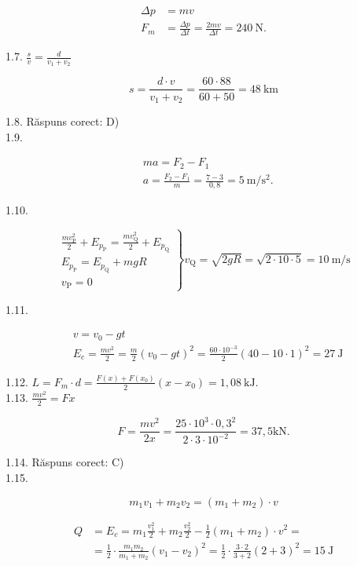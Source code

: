 $$
\begin{aligned}
\Delta p & =m v \\
F_{m} & =\frac{\Delta p}{\Delta t}=\frac{2 m v}{\Delta t}=240 \mathrm{~N} .
\end{aligned}
$$

1.7. $\frac{s}{v}=\frac{d}{v_{1}+v_{2}}$

$$
s=\frac{d \cdot v}{v_{1}+v_{2}}=\frac{60 \cdot 88}{60+50}=48 \mathrm{~km}
$$

1.8. Răspuns corect: D)\\
1.9.

$$
\begin{aligned}
& m a=F_{2}-F_{1} \\
& a=\frac{F_{2}-F_{1}}{m}=\frac{7-3}{0,8}=5 \mathrm{~m} / \mathrm{s}^{2} .
\end{aligned}
$$

1.10.

$$
\left.\begin{array}{l}
\frac{m v_{\mathrm{P}}^{2}}{2}+E_{p_{\mathrm{P}}}=\frac{m v_{\mathrm{Q}}^{2}}{2}+E_{p_{\mathrm{Q}}} \\
E_{p_{\mathrm{P}}}=E_{p_{\mathrm{Q}}}+m g R \\
v_{\mathrm{P}}=0
\end{array}\right\} v_{\mathrm{Q}}=\sqrt{2 g R}=\sqrt{2 \cdot 10 \cdot 5}=10 \mathrm{~m} / \mathrm{s}
$$

1.11.

$$
\begin{aligned}
& v=v_{0}-g t \\
& E_{c}=\frac{m v^{2}}{2}=\frac{m}{2}\left(v_{0}-g t\right)^{2}=\frac{60 \cdot 10^{-3}}{2}(40-10 \cdot 1)^{2}=27 \mathrm{~J}
\end{aligned}
$$

1.12. $L=F_{m} \cdot d=\frac{F(x)+F\left(x_{0}\right)}{2}\left(x-x_{0}\right)=1,08 \mathrm{~kJ}$.\\
1.13. $\frac{m v^{2}}{2}=F x$

$$
F=\frac{m v^{2}}{2 x}=\frac{25 \cdot 10^{3} \cdot 0,3^{2}}{2 \cdot 3 \cdot 10^{-2}}=37,5 \mathrm{kN} .
$$

1.14. Răspuns corect: C)\\
1.15.

$$
m_{1} v_{1}+m_{2} v_{2}=\left(m_{1}+m_{2}\right) \cdot v
$$

$$
\begin{aligned}
Q & =E_{c}=m_{1} \frac{v_{1}^{2}}{2}+m_{2} \frac{v_{2}^{2}}{2}-\frac{1}{2}\left(m_{1}+m_{2}\right) \cdot v^{2}= \\
& =\frac{1}{2} \cdot \frac{m_{1} m_{2}}{m_{1}+m_{2}}\left(v_{1}-v_{2}\right)^{2}=\frac{1}{2} \cdot \frac{3 \cdot 2}{3+2}(2+3)^{2}=15 \mathrm{~J}
\end{aligned}
$$

